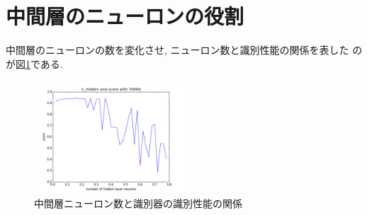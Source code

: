 \documentclass[10pt]{jarticle}
\begin{document}
\section{中間層のニューロンの役割}
中間層のニューロンの数を変化させ, ニューロン数と識別性能の関係を表した
のが図\ref{fig:hidden-neuron-role}である. 
\begin{figure}[htbp]
  \centering
  \includegraphics[width=0.5\textwidth]{assets/img/hidden_layer_analyze_mnist_score_70000.pdf}
  \caption{中間層ニューロン数と識別器の識別性能の関係}
  \label{fig:hidden-neuron-role}
\end{figure}
\end{document}
